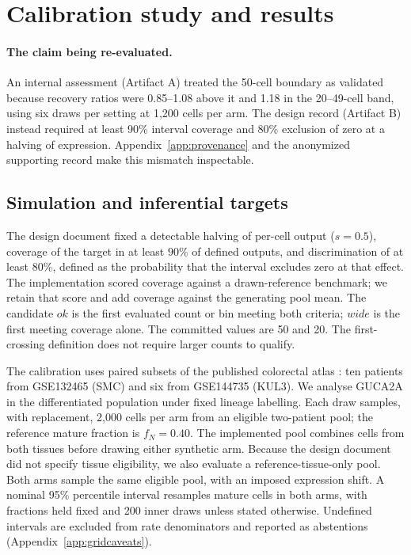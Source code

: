 \section{Calibration study and results}
\label{sec:calibration}

\paragraph{The claim being re-evaluated.}
An internal assessment (Artifact A) treated the 50-cell boundary as validated
because recovery ratios were 0.85--1.08 above it and 1.18 in the 20--49-cell
band, using six draws per setting at 1{,}200 cells per arm. The design record
(Artifact B) instead required at least 90\% interval coverage and 80\% exclusion
of zero at a halving of expression. Appendix~\ref{app:provenance} and the
anonymized supporting record make this mismatch inspectable.

\subsection{Simulation and inferential targets}
The design document fixed a detectable halving of per-cell output ($s=0.5$),
coverage of the target in at least $90\%$ of defined outputs, and discrimination of at least $80\%$, defined as the probability
that the interval excludes zero at that effect. The implementation scored coverage against a drawn-reference benchmark;
we retain that score and add coverage against the generating pool mean.
The candidate $ok$ is the first evaluated count or bin meeting both criteria;
$wide$ is the first meeting coverage alone. The committed values are 50 and 20.
The first-crossing definition does not require larger counts to qualify.

The calibration uses paired subsets of the published colorectal atlas
\citep{lee2020}: ten patients from GSE132465 (SMC) and six from
GSE144735 (KUL3). We analyse GUCA2A in the differentiated population under fixed
lineage labelling. Each draw samples, with replacement, 2{,}000 cells per arm
from an eligible two-patient pool; the reference mature fraction is $f_N=0.40$.
The implemented pool combines cells from both tissues before drawing either
synthetic arm. Because the design document did not specify tissue eligibility,
we also evaluate a reference-tissue-only pool. Both arms sample the same eligible pool, with an imposed expression shift. A nominal 95\% percentile interval resamples mature cells in
both arms, with fractions held fixed and 200 inner draws unless stated otherwise.
Undefined intervals are excluded from rate denominators and reported as
abstentions (Appendix~\ref{app:gridcaveats}).

